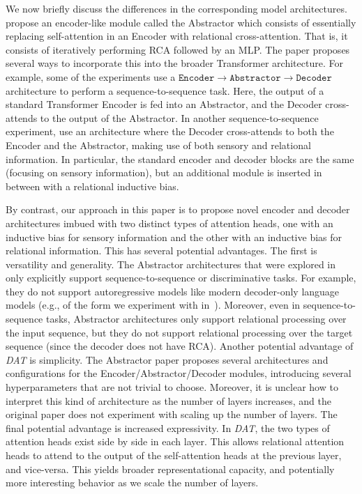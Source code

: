 We now briefly discuss the differences in the corresponding model architectures.~\citet{altabaa2024abstractors} propose an encoder-like module called the Abstractor which consists of essentially replacing self-attention in an Encoder with relational cross-attention. That is, it consists of iteratively performing RCA followed by an MLP. The paper proposes several ways to incorporate this into the broader Transformer architecture. For example, some of the experiments use a $\texttt{Encoder} \to \texttt{Abstractor} \to \texttt{Decoder}$ architecture to perform a sequence-to-sequence task. Here, the output of a standard Transformer Encoder is fed into an Abstractor, and the Decoder cross-attends to the output of the Abstractor. In another sequence-to-sequence experiment, \citet{altabaa2024abstractors} use an architecture where the Decoder cross-attends to both the Encoder and the Abstractor, making use of both sensory and relational information. In particular, the standard encoder and decoder blocks are the same (focusing on sensory information), but an additional module is inserted in between with a relational inductive bias.

By contrast, our approach in this paper is to propose novel encoder and decoder architectures imbued with two distinct types of attention heads, one with an inductive bias for sensory information and the other with an inductive bias for relational information. This has several potential advantages. The first is versatility and generality. The Abstractor architectures that were explored in~\citep{altabaa2024abstractors} only explicitly support sequence-to-sequence or discriminative tasks. For example, they do not support autoregressive models like modern decoder-only language models (e.g., of the form we experiment with in~). Moreover, even in sequence-to-sequence tasks, Abstractor architectures only support relational processing over the input sequence, but they do not support relational processing over the target sequence (since the decoder does not have RCA). Another potential advantage of \textit{DAT} is simplicity. The Abstractor paper proposes several architectures and configurations for the Encoder/Abstractor/Decoder modules, introducing several hyperparameters that are not trivial to choose. Moreover, it is unclear how to interpret this kind of architecture as the number of layers increases, and the original paper does not experiment with scaling up the number of layers. The final potential advantage is increased expressivity. In \textit{DAT}, the two types of attention heads exist side by side in each layer. This allows relational attention heads to attend to the output of the self-attention heads at the previous layer, and vice-versa. This yields broader representational capacity, and potentially more interesting behavior as we scale the number of layers.


